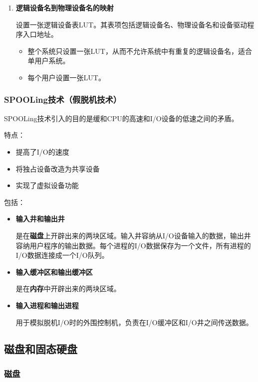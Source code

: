 \documentclass[12pt, a4paper, oneside]{ctexart}
\begin{document}
\begin{enumerate}
  \item {\bf 逻辑设备名到物理设备名的映射}
  
  设置一张逻辑设备表LUT。其表项包括逻辑设备名、物理设备名和设备驱动程序入口地址。
  \begin{itemize}
    \item 整个系统只设置一张LUT，从而不允许系统中有重复的逻辑设备名，适合单用户系统。
    \item 每个用户设置一张LUT。
  \end{itemize}
\end{enumerate}

\subsubsection{SPOOLing技术（假脱机技术）}

SPOOLing技术引入的目的是缓和CPU的高速和I/O设备的低速之间的矛盾。

特点：
\begin{itemize}
  \item 提高了I/O的速度
  \item 将独占设备改造为共享设备
  \item 实现了虚拟设备功能
\end{itemize}

包括：
\begin{itemize}
  \item {\bf 输入井和输出井}
  
  是在\textbf{磁盘}上开辟出来的两块区域。输入井容纳从I/O设备输入的数据，输出井容纳用户程序的输出数据。每个进程的I/O数据保存为一个文件，所有进程的I/O数据连接成一个I/O队列。

  \item {\bf 输入缓冲区和输出缓冲区}
  
  是在\textbf{内存}中开辟出来的两块区域。

  \item {\bf 输入进程和输出进程}
  
  用于模拟脱机I/O时的外围控制机，负责在I/O缓冲区和I/O井之间传送数据。
\end{itemize}

\subsection{磁盘和固态硬盘}

\subsubsection{磁盘}
\end{document}
